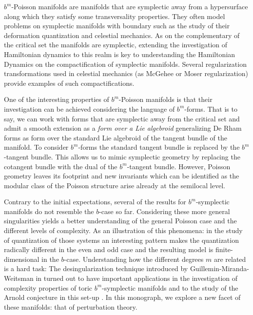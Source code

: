 $b^m$-Poisson manifolds are manifolds that are symplectic away from a hypersurface along which they satisfy some transversality properties. They often model problems on symplectic manifolds with boundary such as the study of their deformation quantization and celestial mechanics.  As on the complementary of the critical set the manifolds are symplectic, extending the investigation of Hamiltonian dynamics to this realm is key to understanding the Hamiltonian Dynamics on the compactification of symplectic manifolds. Several regularization transformations used in celestial mechanics (as McGehee or Moser regularization) provide examples of such compactifications.

One of the interesting properties of $b^m$-Poisson manifolds is that their investigation can be achieved considering the language of $b^m$-forms. That is to say, we can work with forms that are symplectic away from the critical set and admit a smooth extension as a \emph{form over a Lie algebroid} generalizing De Rham forms as form over the standard Lie algebroid of the tangent bundle of the manifold. To consider $b^m$-forms the standard tangent bundle is replaced by  the $b^m$-tangent bundle. This allows us to mimic symplectic geometry by replacing the cotangent bundle with the dual of the $b^m$-tangent bundle. However, Poisson geometry leaves its footprint and new invariants which can be identified as the modular class of the Poisson structure arise already at the semilocal level.

Contrary to the initial expectations,  several of the results for $b^m$-symplectic manifolds do not resemble the $b$-case so far. Considering these more general singularities yields a better understanding of the general Poisson case and the different levels of complexity. As an illustration of this phenomena: in the study of quantization of those systems an interesting pattern makes the quantization radically different in the even and odd case \cite{GMWbquant, GMWbmquant} and the resulting model is finite-dimensional in the $b$-case. Understanding how the different degrees $m$ are related is a hard task: The desingularization technique introduced by Guillemin-Miranda-Weitsman in \cite{GMW17} turned out to have important applications in the investigation of complexity properties of toric $b^m$-symplectic manifolds \cite{GMWbmconvexity} and to the study of the Arnold conjecture in this set-up \cite{cedricjoaquimeva}. In this monograph, we explore a new facet of these manifolds: that of perturbation theory.

